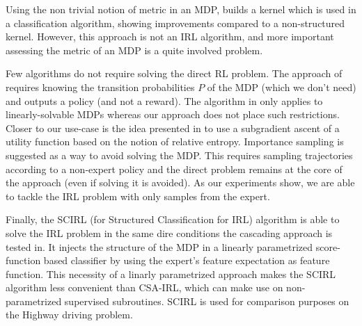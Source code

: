 \documentclass[smallextended]{svjour3}
\begin{document}
Using the non trivial notion of metric in an MDP, \cite{melo2010learning} builds a kernel which is used
in a classification algorithm, showing improvements compared to a
non-structured kernel. However, this approach is not an IRL
algorithm, and more important assessing the metric of an MDP is a
quite involved problem.


Few algorithms do not require solving the direct RL problem. The approach of \cite{syed2008apprenticeship} requires knowing the transition probabilities $P$ of the MDP (which we don't need) and outputs a policy (and not a reward). The algorithm in \cite{dvijotham2010inverse} only applies to linearly-solvable MDPs whereas our approach does not place such restrictions. Closer to our use-case is the idea presented in \cite{boularias2011relative} to use a subgradient ascent of a utility function based on the notion of relative entropy. Importance sampling is suggested as a way to avoid solving the MDP. This requires sampling trajectories according to a non-expert policy and
the direct problem remains at the core of the approach (even if
solving it is avoided). As our experiments show, we are able to tackle the IRL problem with only samples from the expert.


Finally, the SCIRL (for Structured Classification for IRL) algorithm \cite{klein2012scirl} is able to solve the IRL problem in the same dire conditions the cascading approach is tested in. It injects the structure of the MDP in a linearly parametrized score-function based classifier by using the expert's feature expectation as feature function. This necessity of a linarly parametrized approach makes the SCIRL algorithm less convenient than CSA-IRL, which can make use on non-parametrized supervised subroutines. SCIRL is used for comparison purposes on the Highway driving problem.


\end{document}

